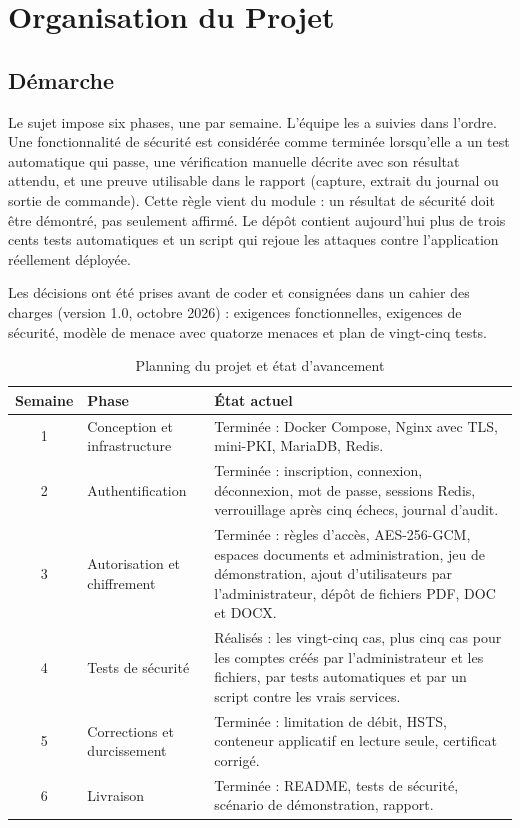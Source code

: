 \documentclass[12pt,a4paper]{report}
\begin{document}
\chapter{Organisation du Projet}

\section{Démarche}

Le sujet impose six phases, une par semaine. L'équipe les a suivies dans l'ordre. Une fonctionnalité de sécurité est considérée comme terminée lorsqu'elle a un test automatique qui passe, une vérification manuelle décrite avec son résultat attendu, et une preuve utilisable dans le rapport (capture, extrait du journal ou sortie de commande). Cette règle vient du module : un résultat de sécurité doit être démontré, pas seulement affirmé. Le dépôt contient aujourd'hui plus de trois cents tests automatiques et un script qui rejoue les attaques contre l'application réellement déployée.

Les décisions ont été prises avant de coder et consignées dans un cahier des charges (version 1.0, octobre 2026) : exigences fonctionnelles, exigences de sécurité, modèle de menace avec quatorze menaces et plan de vingt-cinq tests.

\begin{table}[H]
\centering
\begin{tabular}{@{}c l p{7.2cm}@{}}
\toprule
\textbf{Semaine} & \textbf{Phase} & \textbf{État actuel} \\
\midrule
1 & Conception et infrastructure & Terminée : Docker Compose, Nginx avec TLS, mini-PKI, MariaDB, Redis. \\
2 & Authentification & Terminée : inscription, connexion, déconnexion, mot de passe, sessions Redis, verrouillage après cinq échecs, journal d'audit. \\
3 & Autorisation et chiffrement & Terminée : règles d'accès, AES-256-GCM, espaces documents et administration, jeu de démonstration, ajout d'utilisateurs par l'administrateur, dépôt de fichiers PDF, DOC et DOCX. \\
4 & Tests de sécurité & Réalisés : les vingt-cinq cas, plus cinq cas pour les comptes créés par l'administrateur et les fichiers, par tests automatiques et par un script contre les vrais services. \\
5 & Corrections et durcissement & Terminée : limitation de débit, HSTS, conteneur applicatif en lecture seule, certificat corrigé. \\
6 & Livraison & Terminée : README, tests de sécurité, scénario de démonstration, rapport. \\
\bottomrule
\end{tabular}
\caption{Planning du projet et état d'avancement}
\end{table}
\end{document}

